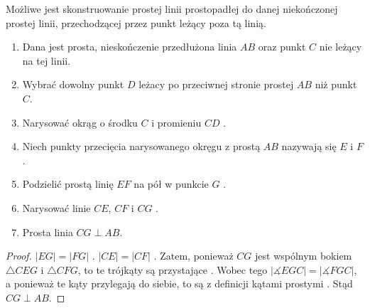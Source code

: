 \documentclass[12pt, a4paper]{scrartcl}
\begin{document}
\begin{theorem}
    Możliwe jest skonstruowanie prostej linii prostopadłej do danej niekończonej
    prostej linii, przechodzącej przez punkt leżący poza tą linią.

    \begin{enumerate}
        \item Dana jest prosta, nieskończenie przedłużona linia \(AB\) oraz
            punkt \(C\) nie leżący na tej linii.
        \item Wybrać dowolny punkt \(D\) leżacy po przeciwnej stronie prostej
            \(AB\) niż punkt \(C\).
        \item Narysować okrąg o środku \(C\) i promieniu \(CD\) .
        \item Niech punkty przecięcia narysowanego okręgu z prostą \(AB\)
            nazywają się \(E\) i \(F\).
        \item Podzielić prostą linię \(EF\) na pół w punkcie \(G\) .
        \item Narysować linie \(CE\), \(CF\) i \(CG\) .
        \item Prosta linia \(CG \perp AB\).
    \end{enumerate}

    \begin{figure}[H]
        \begin{center}
        \end{center}
    \end{figure}

    \begin{proof}
        \(|EG| = |FG|\) . \(|CE| = |CF|\) . Zatem,
        ponieważ \(CG\) jest wspólnym bokiem \(\triangle CEG\) i \(\triangle
        CFG\), to te trójkąty są przystające . Wobec tego
        \(|\measuredangle EGC| = |\measuredangle FGC|\), a ponieważ te kąty
        przylegają do siebie, to są z definicji kątami prostymi .
        Stąd \(CG \perp AB\).
    \end{proof}
\end{theorem}
\end{document}

